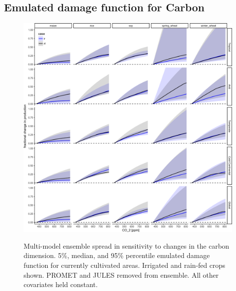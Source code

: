 \documentclass[10pt]{article}
\begin{document}
\subsection{Emulated damage function for Carbon}
\begin{figure}[h!]
\includegraphics[width=\textwidth]{s_carbon.png}\\
\caption{Multi-model ensemble spread in sensitivity to changes in the carbon dimension.  5\%, median,  and 95\% percentile emulated damage function for currently cultivated areas. Irrigated and rain-fed crops shown. PROMET and JULES removed from ensemble. All other covariates held constant.}
\label{fig:carbon}
\end{figure}
\clearpage
\end{document}
